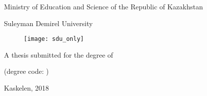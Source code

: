 \begin{titlepage}
\begin{center}
\large
Ministry of Education and Science of the Republic of Kazakhstan

Suleyman Demirel University

\vspace{1cm}
\begin{figure}[h]
    \centering
    \texttt{[image: sdu\_only]}
\end{figure}

\vspace{2cm}
\Large
\myauthor

\vspace{1cm}
\Large
\textbf{\mytitle}

\vspace{1cm}
\large
A thesis submitted for the degree of

\mydegree

(degree code: \mydegreecode)

\vfill
Kaskelen, 2018

\end{center}
\end{titlepage}